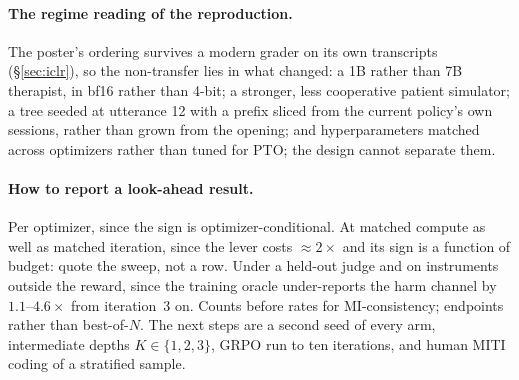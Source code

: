 \paragraph{The regime reading of the reproduction.} The poster's ordering survives a modern
grader on its own transcripts (\S\ref{sec:iclr}), so the non-transfer lies in what changed: a 1B
rather than 7B therapist, in bf16 rather than 4-bit; a stronger, less cooperative patient
simulator; a tree seeded at utterance 12 with a prefix sliced from the current policy's own
sessions, rather than grown from the opening; and hyperparameters matched across optimizers
rather than tuned for PTO; the design cannot separate them.

\paragraph{How to report a look-ahead result.} Per optimizer, since the sign is
optimizer-conditional. At matched compute as well as matched iteration, since the lever costs
${\approx}2\times$ and its sign is a function of budget: quote the sweep, not a row. Under a
held-out judge and on instruments outside the reward, since the training oracle under-reports
the harm channel by $1.1$--$4.6\times$ from iteration~3 on. Counts before rates for MI-consistency; endpoints rather
than best-of-$N$. The next steps are a second seed of every arm, intermediate depths
$K \in \{1, 2, 3\}$, GRPO \Kf{} run to ten iterations, and human MITI coding of a stratified
sample.
